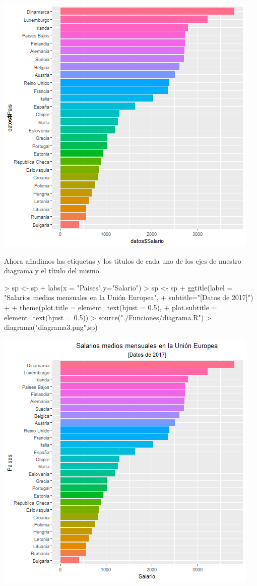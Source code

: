 \documentclass [a4paper] {article}
\begin{document}
\includegraphics[width=\textwidth]{diagrama2}

\bigskip
Ahora añadimos las etiquetas y los titulos de cada uno de los ejes de nuestro diagrama y el título del mismo.
\begin{Schunk}
\begin{Sinput}
> sp <- sp + labs(x = "Paises",y="Salario")
> sp <- sp + ggtitle(label = "Salarios medios mensuales en la Unión Europea",
+         subtitle="[Datos de 2017]") + 
+         theme(plot.title = element_text(hjust = 0.5),
+         plot.subtitle = element_text(hjust = 0.5))
> source("./Funciones/diagrama.R")
> diagrama("diagrama3.png",sp)
\end{Sinput}
\end{Schunk}

\includegraphics[width=\textwidth]{diagrama3}
\end{document}
